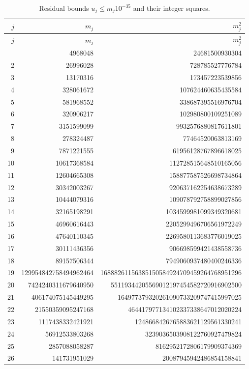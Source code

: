 {\footnotesize
\setlength{\tabcolsep}{3pt}
\begin{longtable}{rrr}
\caption{Residual bounds $u_j\le m_j10^{-35}$ and their integer squares.}\label{tab:residual-all}\\
\toprule $j$ & $m_j$ & $m_j^2$\\ \midrule
\endfirsthead
\toprule $j$ & $m_j$ & $m_j^2$\\ \midrule
\endhead
\bottomrule\endfoot
1 & 4968048 & 24681500930304\\
2 & 26996028 & 728785527776784\\
3 & 13170316 & 173457223539856\\
4 & 328061672 & 107624460635435584\\
5 & 581968552 & 338687395516976704\\
6 & 320906217 & 102980800109251089\\
7 & 3151599099 & 9932576880817611801\\
8 & 278324487 & 77464520063813169\\
9 & 7871221555 & 61956128767896618025\\
10 & 10617368584 & 112728515648510165056\\
11 & 12604665308 & 158877587526698734864\\
12 & 30342003267 & 920637162254638673289\\
13 & 10444079316 & 109078792758899027856\\
14 & 32165198291 & 1034599981099349320681\\
15 & 46960616443 & 2205299496706561972249\\
16 & 47640110345 & 2269580113683776019025\\
17 & 30111436356 & 906698599421438558736\\
18 & 89157506344 & 7949060937480400246336\\
19 & 129954842758494962464 & 16888261156385150584924709459264768951296\\
20 & 7424240311679640950 & 55119344205569012197454582720916902500\\
21 & 406174075145449295 & 164977379320261090733209747415997025\\
22 & 21550359095247168 & 464417977134102337338647012020224\\
23 & 1117438332421921 & 1248668426765883621129561330241\\
24 & 56912533803268 & 3239036503908122760927479824\\
25 & 2857088058287 & 8162952172806179909374369\\
26 & 141731951029 & 20087945942486854158841\\

\end{longtable}}
